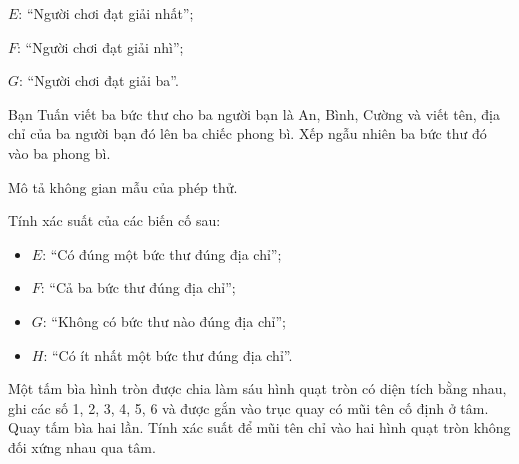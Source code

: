 \begin{practice}
\begin{questions}[resume=SBT]
        \begin{questions}
            \item $E$: “Người chơi đạt giải nhất”;
            \item $F$: “Người chơi đạt giải nhì”;
            \item $G$: “Người chơi đạt giải ba”.
        \end{questions}
        \answerline
        \answerline
        \answerline

        \item Bạn Tuấn viết ba bức thư cho ba người bạn là An, Bình, Cường và viết tên, địa chỉ của ba người bạn đó lên ba chiếc phong bì. Xếp ngẫu nhiên ba bức thư đó vào ba phong bì.
        \begin{questions}
            \item Mô tả không gian mẫu của phép thử.
            \item Tính xác suất của các biến cố sau:
            \begin{itemize}
                \item $E$: “Có đúng một bức thư đúng địa chỉ”;
                \item $F$: “Cả ba bức thư đúng địa chỉ”;
                \item $G$: “Không có bức thư nào đúng địa chỉ”;
                \item $H$: “Có ít nhất một bức thư đúng địa chỉ”.
            \end{itemize}
        \end{questions}
        \answerline
        \answerline
        \answerline

        \item Một tấm bìa hình tròn được chia làm sáu hình quạt tròn có diện tích bằng nhau, ghi các số 1, 2, 3, 4, 5, 6 và được gắn vào trục quay có mũi tên cố định ở tâm. Quay tấm bìa hai lần. Tính xác suất để mũi tên chỉ vào hai hình quạt tròn không đối xứng nhau qua tâm.

        \begin{center}
        \end{center}
        \answerline
        \answerline


\end{questions}
\end{practice}
